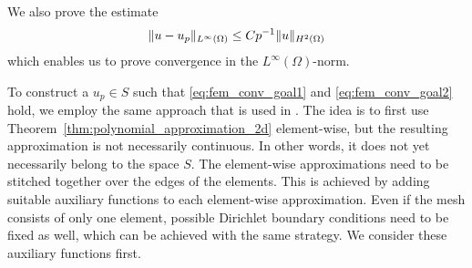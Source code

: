 \documentclass[english, 12pt, a4paper, sci, utf8, a-2b, online]{aaltothesis}
\theoremstyle{definition}
\theoremstyle{plain}
\DeclarePairedDelimiter\norm{\lVert}{\rVert}
\numberwithin{equation}{section}
\begin{document}
We also prove the estimate
\begin{equation}
    \label{eq:fem_conv_goal2}
    \norm{u-u_p}_{L^{\infty}(\Omega)}
    \leq C p^{-1} \norm{u}_{H^2(\Omega)}
\end{equation}
which enables us to prove convergence in the $L^{\infty}(\Omega)$-norm.

To construct a $u_p \in S$ such that \eqref{eq:fem_conv_goal1}
and \eqref{eq:fem_conv_goal2} hold, we employ the same approach that
is used in \cite{babuskasuri1987}. The idea is to first use
Theorem~\ref{thm:polynomial_approximation_2d} element-wise,
but the resulting approximation is not necessarily continuous.
In other words, it does not yet necessarily belong to the space $S$.
The element-wise approximations need to be stitched together
over the edges of the elements. This is achieved by adding
suitable auxiliary functions to each element-wise approximation.
Even if the mesh consists of only one element,
possible Dirichlet boundary conditions need to be fixed as well,
which can be achieved with the same strategy.
We consider these auxiliary functions first.
\end{document}
